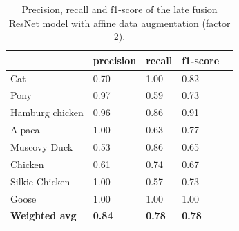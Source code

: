 \documentclass{l4proj}
\begin{document}
\begin{appendices}
\begin{table}[H]
  \centering
  \begin{tabular}{@{}lllll@{}}
  \toprule
                        & \textbf{precision} & \textbf{recall} & \textbf{f1-score} &  \\ \midrule
  Cat                   & 0.70               & 1.00            & 0.82              &  \\
  Pony                  & 0.97               & 0.59            & 0.73              &  \\
  Hamburg chicken       & 0.96               & 0.86            & 0.91              &  \\
  Alpaca                & 1.00               & 0.63            & 0.77              &  \\
  Muscovy Duck          & 0.53               & 0.86            & 0.65              &  \\
  Chicken               & 0.61               & 0.74            & 0.67              &  \\
  Silkie Chicken        & 1.00               & 0.57            & 0.73              &  \\
  Goose                 & 1.00               & 1.00            & 1.00              &  \\
  \midrule
  \textbf{Weighted avg} & \textbf{0.84}      & \textbf{0.78}   & \textbf{0.78}     &  \\ \bottomrule
  \end{tabular}
  \vspace*{3mm}
  \caption{Precision, recall and f1-score of the late fusion ResNet model with affine data augmentation (factor 2).}
  \label{table:appendix_affine_2}
  \vspace*{-3mm}
\end{table}


\end{appendices}
\end{document}
